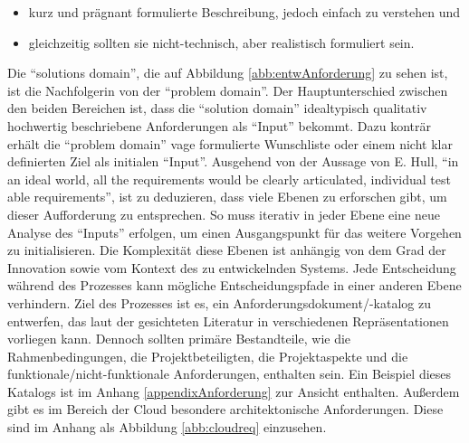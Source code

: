 \begin{itemize}
	\item kurz und prägnant formulierte Beschreibung, jedoch einfach zu verstehen und
	\item gleichzeitig sollten sie nicht-technisch, aber realistisch formuliert sein.
\end{itemize}
 
 Die \enquote{solutions domain}, die auf Abbildung \vref{abb:entwAnforderung} zu sehen ist, ist die Nachfolgerin von der \enquote{problem domain}. Der Hauptunterschied zwischen den beiden Bereichen ist, dass die \enquote{solution domain} idealtypisch qualitativ hochwertig beschriebene Anforderungen als \enquote{Input} bekommt. Dazu konträr erhält die \enquote{problem domain} vage formulierte Wunschliste oder einem nicht klar definierten Ziel als initialen \enquote{Input}. Ausgehend von der Aussage von E. Hull, \enquote{in an ideal world, all the requirements would be clearly articulated, individual test able requirements}\autocite[][S.115]{hull_requirements_2011}, ist zu deduzieren, dass viele Ebenen zu erforschen gibt, um dieser Aufforderung zu entsprechen. So muss iterativ in jeder Ebene eine neue Analyse des \enquote{Inputs} erfolgen, um einen Ausgangspunkt für das weitere Vorgehen zu initialisieren. Die Komplexität diese Ebenen ist anhängig von dem Grad der Innovation sowie vom Kontext des zu entwickelnden Systems. Jede Entscheidung während des Prozesses kann mögliche Entscheidungspfade in einer anderen Ebene verhindern. Ziel des Prozesses ist es, ein Anforderungsdokument/-katalog zu entwerfen, das laut der gesichteten Literatur in verschiedenen Repräsentationen vorliegen kann. Dennoch sollten primäre Bestandteile, wie die Rahmenbedingungen, die Projektbeteiligten, die Projektaspekte und die funktionale/nicht-funktionale Anforderungen, enthalten sein. Ein Beispiel dieses Katalogs ist im Anhang \vref{appendixAnforderung} zur Ansicht enthalten. Außerdem gibt es im Bereich der Cloud besondere architektonische Anforderungen. Diese sind im Anhang als Abbildung \vref{abb:cloudreq} einzusehen.
 
